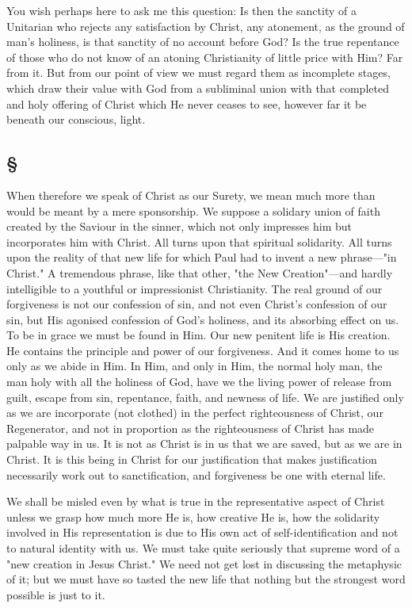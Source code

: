 \documentclass[draft]{ptfdoc}
\begin{document}
You wish perhaps here to ask me this question: 
Is then the sanctity of a Unitarian who rejects 
any satisfaction by Christ, any atonement, as the 
ground of man's holiness, is that sanctity of no 
account before God? Is the true repentance of 
those who do not know of an atoning Christianity 
of little price with Him? Far from it. But from 
our point of view we must regard them as incomplete 
stages, which draw their value with 
God from a subliminal union with that completed 
and holy offering of Christ which He never ceases 
to see, however far it be beneath our conscious, 
light. 

\subsection*{
\S
}

When therefore we speak of Christ as our 
Surety, we mean much more than would be 
meant by a mere sponsorship. We suppose a 
solidary union of faith created by the Saviour in 
the sinner, which not only impresses him but 
incorporates him with Christ. All turns upon 
that spiritual solidarity. All turns upon the 
reality of that new life for which Paul had to 
invent a new phrase---"in Christ." A tremendous 
phrase, like that other, "the New Creation"---and 
hardly intelligible to a youthful or impressionist 
Christianity. The real ground of our forgiveness 
is not our confession of sin, and not even 
Christ's confession of our sin, but His agonised 
confession of God's holiness, and its absorbing 
effect on us. To be in grace we must be 
found in Him. Our new penitent life is His 
creation. He contains the principle and power 
of our forgiveness. And it comes home to us 
only as we abide in Him. In Him, and only 
in Him, the normal holy man, the man holy 
with all the holiness of God, have we the 
living power of release from guilt, escape from 
sin, repentance, faith, and newness of life. 
We are justified only as we are incorporate 
(not clothed) in the perfect righteousness of 
Christ, our Regenerator, and not in proportion as the righteousness of Christ has made 
palpable way in us. It is not as Christ is in 
us that we are saved, but as we are in Christ. 
It is this being in Christ for our justification 
that makes justification necessarily work out 
to sanctification, and forgiveness be one with 
eternal life. 

We shall be misled even by what is true in the 
representative aspect of Christ unless we grasp 
how much more He is, how creative He is, how 
the solidarity involved in His representation is 
due to His own act of self-identification and 
not to natural identity with us. We must take 
quite seriously that supreme word of a "new 
creation in Jesus Christ." We need not get 
lost in discussing the metaphysic of it; but 
we must have so tasted the new life that 
nothing but the strongest word possible is just 
to it. 
\end{document}
